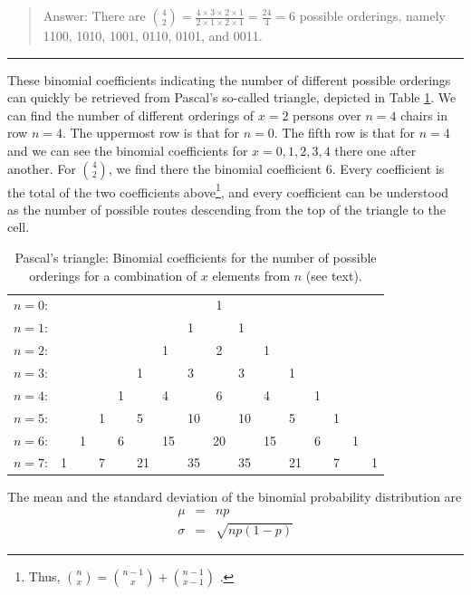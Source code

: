 \documentclass[
]{book}
\begin{document}
\begin{quote}
Answer: There are
\({4 \choose 2} = \frac{4\times3\times2\times1}{2\times1\times2\times1} = \frac{24}{4} = 6\)
possible orderings, namely 1100, 1010, 1001, 0110, 0101, and 0011.
\end{quote}

\begin{center}\rule{0.5\linewidth}{0.5pt}\end{center}

These binomial coefficients indicating the number of different
possible orderings can quickly be retrieved from Pascal's so-called
triangle, depicted in Table \ref{tab:pascaltriangle}.
We can find the number of different
orderings of \(x=2\) persons over \(n=4\) chairs in row \(n=4\).
The uppermost row is that for \(n=0\). The fifth row is that for \(n=4\) and we
can see the binomial coefficients for \(x= 0, 1, 2, 3, 4\) there one after another.
For \({4 \choose 2}\), we find there the binomial coefficient \(6\).
Every coefficient is the total of the two coefficients above\footnote{Thus, \({n \choose x} = {n-1 \choose x} + {n-1 \choose x-1}\) \citep{Weis15}.}, and
every coefficient can be understood as the number of possible
routes descending from the top of the triangle
to the cell.

\begin{longtable}[]{@{}llllllllclllllll@{}}
\caption{\label{tab:pascaltriangle} Pascal's triangle: Binomial coefficients for the
number of possible orderings for a combination of \(x\) elements from \(n\) (see text).}\tabularnewline
\toprule\noalign{}
\endfirsthead
\endhead
\bottomrule\noalign{}
\endlastfoot
\(n= 0\): & & & & & & & & 1 & & & & & & & \\
\(n= 1\): & & & & & & & 1 & & 1 & & & & & & \\
\(n= 2\): & & & & & & 1 & & 2 & & 1 & & & & & \\
\(n= 3\): & & & & & 1 & & 3 & & 3 & & 1 & & & & \\
\(n= 4\): & & & & 1 & & 4 & & 6 & & 4 & & 1 & & & \\
\(n= 5\): & & & 1 & & 5 & & 10 & & 10 & & 5 & & 1 & & \\
\(n= 6\): & & 1 & & 6 & & 15 & & 20 & & 15 & & 6 & & 1 & \\
\(n= 7\): & 1 & & 7 & & 21 & & 35 & & 35 & & 21 & & 7 & & 1 \\
\end{longtable}

The mean and the standard deviation of the binomial probability distribution
are \[\begin{aligned}
    \mu & = & np \\
    \sigma & = & \sqrt{ np(1-p) }\end{aligned}\]
\end{document}
